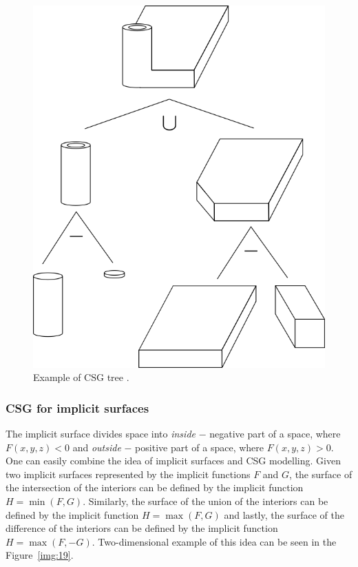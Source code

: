 \begin{figure}
    \centerline{\includegraphics[scale=0.5]{images/img18}}
    \caption[Example of CSG tree]
    {Example of CSG tree \cite{foley1996computer}.}
    \label{img:18}
\end{figure}

\subsubsection*{CSG for implicit surfaces}
The implicit surface divides space into \textit{inside} $-$ negative part of a space,
where $F(x, y, z) < 0$ and
\textit{outside} $-$ positive part of a space, where $F(x, y, z) > 0$. One can easily 
combine the idea of
implicit surfaces and CSG modelling. Given two implicit surfaces represented
by the implicit functions $F$ and $G$, the surface of the
intersection of the interiors can be defined by the implicit function $H=\min(F, G)$.
Similarly, the surface of the union of the interiors can be defined
by the implicit function $H=\max(F, G)$ and lastly, the surface of the difference of
the interiors can be defined by the implicit function $H=\max(F, -G)$. Two-dimensional
example of this idea can be seen in the Figure~\ref{img:19}.

